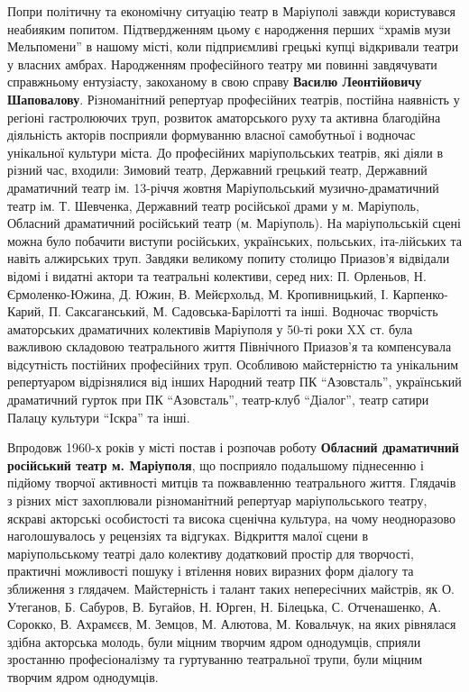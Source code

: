 Попри політичну та економічну ситуацію театр в Маріуполі завжди користувався
неабияким попитом. Підтвердженням цьому є народження перших \enquote{храмів музи
Мельпомени} в нашому місті, коли підприємливі грецькі купці відкривали театри у
власних амбрах. Народженням професійного театру ми повинні завдячувати
справжньому ентузіасту, закоханому в свою справу \textbf{Василю Леонтійовичу
Шаповалову}. Різноманітний репертуар професійних театрів, постійна наявність у
регіоні гастролюючих труп, розвиток аматорського руху та активна благодійна
діяльність акторів посприяли формуванню власної самобутньої і водночас
унікальної культури міста. До професійних маріупольських театрів, які діяли в
різний час, входили: Зимовий театр, Державний грецький театр, Державний
драматичний театр ім. 13-річчя жовтня Маріупольський музично-драматичний театр
ім. Т. Шевченка, Державний театр російської драми у м. Маріуполь, Обласний
драматичний російський театр (м. Маріуполь). На маріупольській сцені можна було
побачити виступи російських, українських, польських, іта\hyp{}лійських та навіть
алжирських труп. Завдяки великому попиту столицю Приазов'я відвідали відомі і
видатні актори та театральні колективи, серед них: П. Орленьов, Н.
Єрмоленко-Южина, Д. Южин, В. Мейєрхольд, М. Кропивницький, І. Карпенко-Карий,
П. Саксаганський, М. Садовська-Барілотті та інші. Водночас творчість
аматорських драматичних колективів Маріуполя у 50-ті роки XX ст. була важливою
складовою театрального життя Північного Приазов'я та компенсувала відсутність
постійних професійних труп. Особливою майстерністю та унікальним репертуаром
відрізнялися від інших Народний театр ПК \enquote{Азовсталь}, український драматичний
гурток при ПК \enquote{Азовсталь}, театр-клуб \enquote{Діалог}, театр сатири Палацу культури
\enquote{Іскра} та інші.

Впродовж 1960-х років у місті постав і розпочав роботу \textbf{Обласний драматичний
російський театр м. Маріуполя}, що посприяло подальшому піднесенню і підйому
творчої активності митців та пожвавленню театрального життя. Глядачів з різних
міст захоплювали різноманітний репертуар маріупольського театру, яскраві
акторські особистості та висока сценічна культура, на чому неодноразово
наголошувалось у рецензіях та відгуках. Відкриття малої сцени в маріупольському
театрі дало колективу додатковий простір для творчості, практичні можливості
пошуку і втілення нових виразних форм діалогу та зближення з глядачем.
Майстерність і талант таких непересічних майстрів, як О. Утеганов, Б. Сабуров,
В. Бугайов, Н. Юрген, Н. Білецька, С. Отченашенко, А. Сорокко, В. Ахрамєєв, М.
Земцов, М. Алютова, М. Ковальчук, на яких рівнялася здібна акторська молодь,
були міцним творчим ядром однодумців, сприяли зростанню професіоналізму та
гуртуванню театральної трупи, були міцним творчим ядром однодумців.


